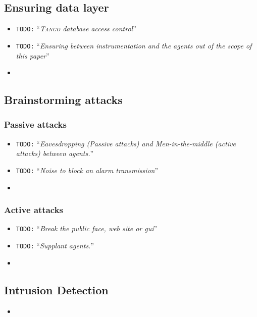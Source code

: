 \documentclass[10pt,a4paper,twoside]{llncs}
\newcommand{\todo}[1]{\texttt{\color{red}TODO:} ``\emph{#1}''}
\newcommand{\tango}{\textsc{Tango} }
\begin{document}
\subsection{Ensuring data layer}

\begin{itemize}
 \item \todo{\tango database access control}
 \item \todo{Ensuring between instrumentation and the agents out of the scope of this paper}
 \item 
\end{itemize}

%
\subsection{Brainstorming attacks}

%
\subsubsection{Passive attacks}

\begin{itemize}
 \item \todo{Eavesdropping (Passive attacks) and Men-in-the-middle (active attacks) between agents.}
 \item \todo{Noise to block an alarm transmission}
 \item 
\end{itemize}

%
\subsubsection{Active attacks}

\begin{itemize}
 \item \todo{Break the public face, web site or gui}
 \item \todo{Supplant agents.}
 \item 
\end{itemize}

%
\subsection{Intrusion Detection}

\begin{itemize}
 \item 
\end{itemize}
\end{document}
